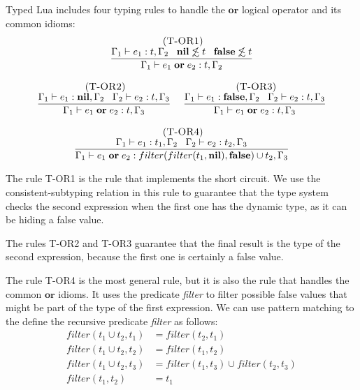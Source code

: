 Typed Lua includes four typing rules to handle the $\mathbf{or}$
logical operator and its common idioms:
\[
\begin{array}{c}
\begin{array}{c}
\; (\textsc{T-OR1})\\
\dfrac{\Gamma_{1} \vdash e_{1}:t, \Gamma_{2} \;\;\;
       \mathbf{nil} \not\lesssim t \;\;\;
       \mathbf{false} \not\lesssim t}
      {\Gamma_{1} \vdash e_{1} \; \mathbf{or} \; e_{2}:t, \Gamma_{2}}
\end{array}
\\ \\
\begin{array}{c}
\; (\textsc{T-OR2})\\
\dfrac{\Gamma_{1} \vdash e_{1}:\mathbf{nil}, \Gamma_{2} \;\;\;
       \Gamma_{2} \vdash e_{2}:t, \Gamma_{3}}
      {\Gamma_{1} \vdash e_{1} \; \mathbf{or} \; e_{2}:t, \Gamma_{3}}
\end{array}
\;
\begin{array}{c}
\; (\textsc{T-OR3})\\
\dfrac{\Gamma_{1} \vdash e_{1}:\mathbf{false}, \Gamma_{2} \;\;\;
       \Gamma_{2} \vdash e_{2}:t, \Gamma_{3}}
      {\Gamma_{1} \vdash e_{1} \; \mathbf{or} \; e_{2}:t, \Gamma_{3}}
\end{array}
\\ \\
\begin{array}{c}
\; (\textsc{T-OR4})\\
\dfrac{\Gamma_{1} \vdash e_{1}:t_{1}, \Gamma_{2} \;\;\;
       \Gamma_{2} \vdash e_{2}:t_{2}, \Gamma_{3}}
      {\Gamma_{1} \vdash e_{1} \; \mathbf{or} \; e_{2}:filter(filter(t_{1}, \mathbf{nil}), \mathbf{false}) \cup t_{2}, \Gamma_{3}}
\end{array}
\end{array}
\]

The rule \textsc{T-OR1} is the rule that implements the short circuit.
We use the consistent-subtyping relation in this rule to guarantee that
the type system checks the second expression when the first one
has the dynamic type, as it can be hiding a false value.

The rules \textsc{T-OR2} and \textsc{T-OR3} guarantee that the final
result is the type of the second expression, because the first one
is certainly a false value.

The rule \textsc{T-OR4} is the most general rule, but it is also
the rule that handles the common $\mathbf{or}$ idioms.
It uses the predicate \emph{filter} to filter possible false values
that might be part of the type of the first expression.
We can use pattern matching to the define the recursive predicate
\emph{filter} as follows:
\begin{align*}
filter(t_{1} \cup t_{2}, t_{1}) & = filter(t_{2}, t_{1})\\
filter(t_{1} \cup t_{2}, t_{2}) & = filter(t_{1}, t_{2})\\
filter(t_{1} \cup t_{2}, t_{3}) & = filter(t_{1}, t_{3}) \cup filter(t_{2}, t_{3})\\
filter(t_{1}, t_{2}) & = t_{1}
\end{align*}

